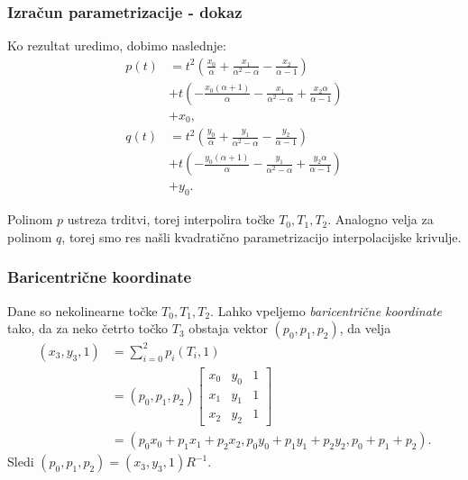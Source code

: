 \documentclass{beamer}
\newcommand{\al}{\alpha}
\begin{document}

\begin{frame}

\frametitle{Izračun parametrizacije - dokaz}

Ko rezultat uredimo, dobimo naslednje: 
\begin{align*}
p(t) &= t^2 ( \frac{x_0}{\al} + \frac{x_1}{\al^2 - \al} - \frac{x_2}{\al -1} ) \\
&+ t(- \frac{x_0(\al + 1)}{\al} - \frac{x_1}{\al^2 - \al} + \frac{x_2 \al}{\al - 1}) \\
&+ x_0, \\
q(t) &= t^2 ( \frac{y_0}{\al} + \frac{y_1}{\al^2 - \al} - \frac{y_2}{\al -1} ) \\ 
&+ t(- \frac{y_0(\al + 1)}{\al} - \frac{y_1}{\al^2 - \al} + \frac{y_2 \al}{\al - 1}) \\ 
&+ y_0.
\end{align*}

Polinom $p$ ustreza trditvi, torej interpolira točke $T_0, T_1, T_2$. 
Analogno velja za polinom $q$, torej smo res našli kvadratično parametrizacijo interpolacijske krivulje.

\end{frame}


\begin{frame}

\frametitle{Baricentrične koordinate}

Dane so  nekolinearne točke $T_0, T_1, T_2$. Lahko vpeljemo \emph{baricentrične koordinate} tako, da za neko četrto točko $T_3$ obstaja vektor $(p_0, p_1, p_2)$, da velja
\begin{align*}
( x_3,y_3, 1) &= \sum_{i=0}^{2} p_i (T_i, 1) \\
	&= (p_0, p_1, p_2)
\begin{bmatrix}
x_0 & y_0 & 1 \\
x_1 & y_1 & 1 \\
x_2 & y_2 & 1 
\end{bmatrix} \\
	&= (p_0 x_0 + p_1 x_1 + p_2 x_2, p_0 y_0 + p_1 y_1 + p_2 y_2, p_0 + p_1 + p_2).
\end{align*}
Sledi $ (p_0, p_1, p_2) = ( x_3,y_3, 1) R^{-1}$.


\end{frame}
\end{document}
